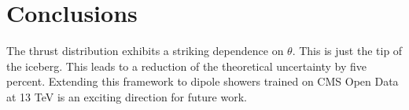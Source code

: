 \section{Conclusions}\label{sec:conclusions}

The thrust distribution exhibits a striking dependence on $\theta$. This
is just the tip of the iceberg. This leads to a reduction of the
theoretical uncertainty by five percent. Extending this framework to
dipole showers trained on CMS Open Data at 13 TeV is an exciting
direction for future work.

